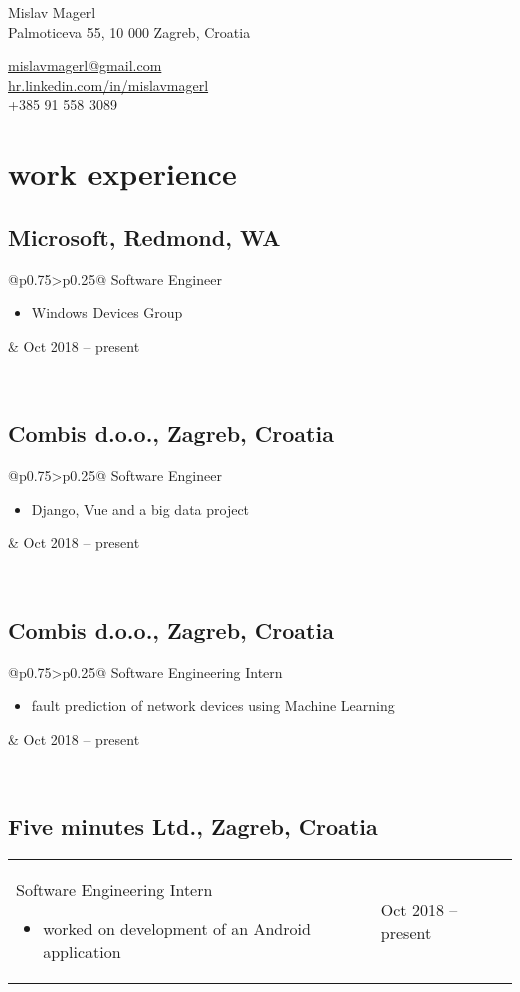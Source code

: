 \documentclass[a4paper]{article}
\makeatletter
\newlength{\tablewidth}
\newenvironment{period}[2]{%
\newcommand{\sarma}{#2}%
\setlength{\tablewidth}{\linewidth}
\addtolength{\tablewidth}{-2\tabcolsep}
\begin{tabular}{@{}p{0.75\tablewidth}>{\raggedleft\arraybackslash}p{0.25\tablewidth}@{}}%
#1 \newline
\begin{itemize}
}{%
\end{itemize} & \sarma \\%
\end{tabular}\\
}
\makeatother
\begin{document}
\fontfamily{\sfdefault}
\selectfont

\begin{minipage}{.5\textwidth}
\LARGE{Mislav Magerl}\\
\normalsize{Palmoticeva 55, 10 000 Zagreb, Croatia}
\end{minipage}%
\begin{minipage}{.5\textwidth}
\raggedleft
\href{mailto:mislavmagerl@gmail.com}{mislavmagerl@gmail.com} \\
\href{https://hr.linkedin.com/in/mislavmagerl}{hr.linkedin.com/in/mislavmagerl} \\
+385 91 558 3089
\end{minipage}

\vspace{1em}

\section{work experience}
\subsection{Microsoft, Redmond, WA}
\begin{period}{Software Engineer}{Oct 2018 -- present}
    \item Windows Devices Group
\end{period}

\subsection{Combis d.o.o., Zagreb, Croatia}
\begin{period}{Software Engineer}{Sep 2017 -- Sep 2018}
    \item Django, Vue and a big data project
\end{period}

\subsection{Combis d.o.o., Zagreb, Croatia}
\begin{period}{Software Engineering Intern}{Jul 2016 -- Oct 2016}
    \item 
        fault prediction of network devices using Machine Learning
\end{period}

\subsection{Five minutes Ltd., Zagreb, Croatia}
\begin{period}{Software Engineering Intern}{Jul 2015 -- Aug 2015}
    \item 
        worked on development of an Android application
\end{period}
\end{document}
